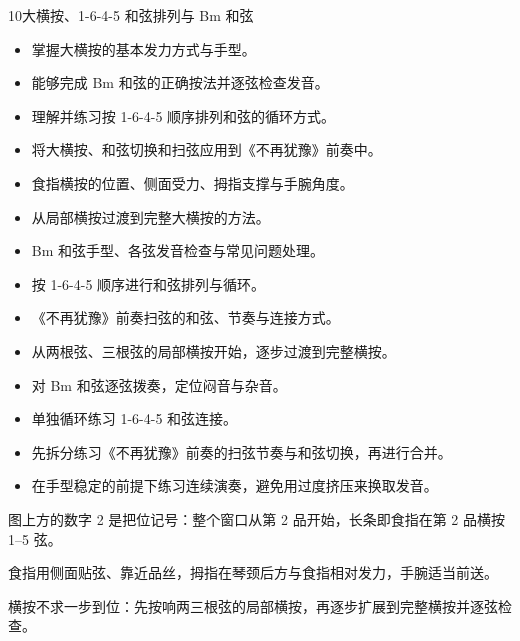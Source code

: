 \begin{lessoncard}{10}{大横按、1-6-4-5 和弦排列与 Bm 和弦}
\begin{itemize}
\item 掌握大横按的基本发力方式与手型。
\item 能够完成 Bm 和弦的正确按法并逐弦检查发音。
\item 理解并练习按 1-6-4-5 顺序排列和弦的循环方式。
\item 将大横按、和弦切换和扫弦应用到《不再犹豫》前奏中。
\end{itemize}
\begin{itemize}
\item 食指横按的位置、侧面受力、拇指支撑与手腕角度。
\item 从局部横按过渡到完整大横按的方法。
\item Bm 和弦手型、各弦发音检查与常见问题处理。
\item 按 1-6-4-5 顺序进行和弦排列与循环。
\item 《不再犹豫》前奏扫弦的和弦、节奏与连接方式。
\end{itemize}
\begin{itemize}
\item 从两根弦、三根弦的局部横按开始，逐步过渡到完整横按。
\item 对 Bm 和弦逐弦拨奏，定位闷音与杂音。
\item 单独循环练习 1-6-4-5 和弦连接。
\item 先拆分练习《不再犹豫》前奏的扫弦节奏与和弦切换，再进行合并。
\item 在手型稳定的前提下练习连续演奏，避免用过度挤压来换取发音。
\end{itemize}
\begin{fignote}
\begin{center}
\chordscheme[name = Bm, position = {2}, barre = {1/5-1:1},
  finger = {2/2:2, 3/4:3, 3/3:4}, mute = {6}]
\hspace{9mm}
\end{center}
\begin{fignotes}
\item 图上方的数字 2 是把位记号：整个窗口从第 2 品开始，长条即食指在第 2 品横按 1--5 弦。
\item 食指用侧面贴弦、靠近品丝，拇指在琴颈后方与食指相对发力，手腕适当前送。
\item 横按不求一步到位：先按响两三根弦的局部横按，再逐步扩展到完整横按并逐弦检查。
\end{fignotes}
\end{fignote}
\end{lessoncard}
